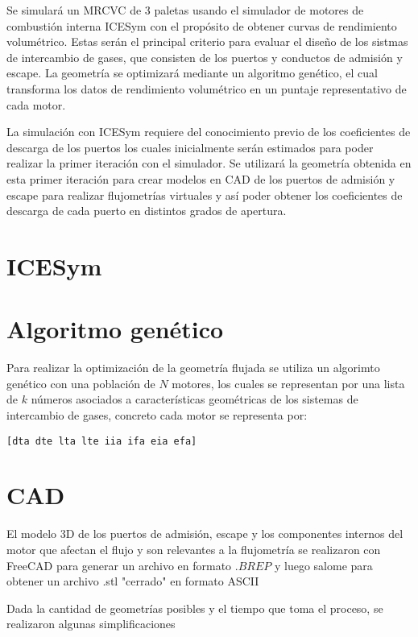 Se simulará un MRCVC de 3 paletas usando el simulador de motores de combustión
interna ICESym \cite{icesym} con el propósito de obtener curvas de rendimiento
volumétrico.
%
Estas serán el principal criterio para evaluar el diseño de los sistmas de
intercambio de gases, que consisten de los puertos y conductos de admisión y
escape.
%
La geometría se optimizará mediante un algoritmo genético, el cual transforma
los datos de rendimiento volumétrico en un puntaje representativo de cada
motor.


La simulación con ICESym requiere del conocimiento previo de los coeficientes
de descarga de los puertos los cuales inicialmente serán estimados para poder
realizar la primer iteración con el simulador.
%
Se utilizará la geometría obtenida en esta primer iteración para crear modelos
en CAD de los puertos de admisión y escape para realizar flujometrías virtuales
y así poder obtener los coeficientes de descarga de cada puerto en distintos
grados de apertura.


\section{ICESym}



\section{Algoritmo genético}

Para realizar la optimización de la geometría flujada se utiliza un algorimto
genético con una población de $N$ motores, los cuales se representan por una
lista de $k$ números asociados a características geométricas de los sistemas de
intercambio de gases, concreto cada motor se representa por:

\begin{verbatim}
[dta dte lta lte iia ifa eia efa]
\end{verbatim}


\section{CAD}
El modelo 3D de los puertos de admisión, escape y los componentes internos del
motor que afectan el flujo y son relevantes a la flujometría se realizaron con
FreeCAD\cite{freecad} para generar un archivo en formato $.BREP$ y luego
salome\cite{salome} para obtener un archivo .stl "cerrado" en formato ASCII

Dada la cantidad de geometrías posibles y el tiempo que toma el proceso, se
realizaron algunas simplificaciones



